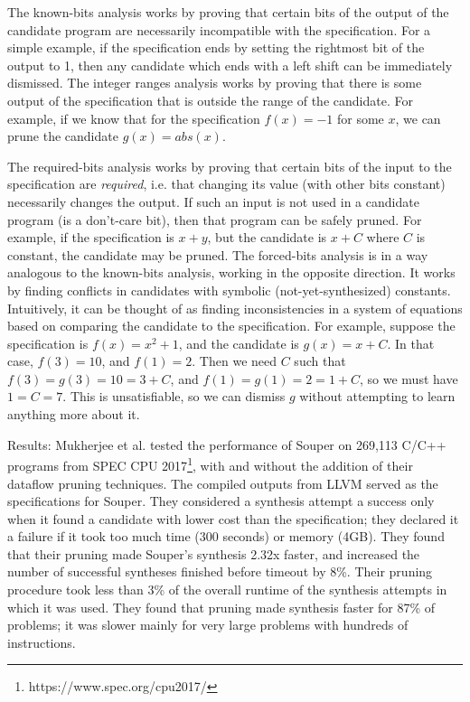 \documentclass[12pt,twoside]{reedthesis}
\begin{document}
            The known-bits analysis works by proving that certain bits of the output of the candidate program are necessarily incompatible with the specification.
                For a simple example, if the specification ends by setting the rightmost bit of the output to 1, then any candidate which ends with a left shift can be immediately dismissed.
            The integer ranges analysis works by proving that there is some output of the specification that is outside the range of the candidate.
                For example, if we know that for the specification $f(x) = -1$ for some $x$, we can prune the candidate $g(x) = abs(x)$.
            
            The required-bits analysis works by proving that certain bits of the input to the specification are \textit{required}, i.e. that changing its value (with other bits constant) necessarily changes the output.
                If such an input is not used in a candidate program (is a don't-care bit), then that program can be safely pruned.
                    For example, if the specification is $x + y$, but the candidate is $x + C$ where $C$ is constant, the candidate may be pruned.
            The forced-bits analysis is in a way analogous to the known-bits analysis, working in the opposite direction.
                It works by finding conflicts in candidates with symbolic (not-yet-synthesized) constants.
                Intuitively, it can be thought of as finding inconsistencies in a system of equations based on comparing the candidate to the specification.
                For example, suppose the specification is $f(x) = x^2 + 1$, and the candidate is $g(x) = x + C$. In that case, $f(3) = 10$, and $f(1) = 2$. Then we need $C$ such that $f(3) = g(3) = 10 = 3 + C$, and $f(1) = g(1) = 2 = 1 + C$, so we must have $1 = C = 7$. This is unsatisfiable, so we can dismiss $g$ without attempting to learn anything more about it.
            
            Results: Mukherjee et al. tested the performance of Souper on 269,113 C/C++ programs from SPEC CPU 2017\footnote{https://www.spec.org/cpu2017/}, with and without the addition of their dataflow pruning techniques.
            The compiled outputs from LLVM served as the specifications for Souper.
            They considered a synthesis attempt a success only when it found a candidate with lower cost than the specification;
            they declared it a failure if it took too much time (300 seconds) or memory (4GB).
            They found that their pruning made Souper's synthesis 2.32x faster, and increased the number of successful syntheses finished before timeout by 8\%.
            Their pruning procedure took less than 3\% of the overall runtime of the synthesis attempts in which it was used.
            They found that pruning made synthesis faster for 87\% of problems; it was slower mainly for very large problems with hundreds of instructions.
\end{document}
